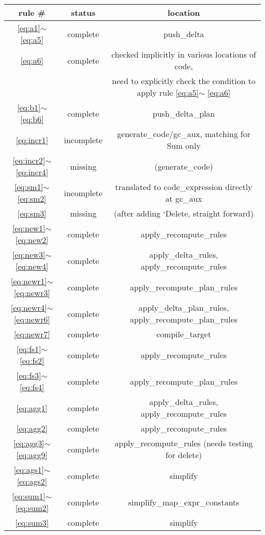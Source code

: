 \documentclass{article}
\begin{document}
\begin{tabular} {|c|c|c|}
\hline rule \# & status & location  \\
\hline \ref{eq:a1}$\sim$\ref{eq:a5} & complete & push\_delta \\
\hline \ref{eq:a6} & complete & checked implicitly in various locations of code, \\
&&need to explicitly check the condition to apply rule \ref{eq:a5}$\sim$ \ref{eq:a6}\\%
\hline \ref{eq:b1}$\sim$\ref{eq:b6} & complete & push\_delta\_plan\\
\hline \ref{eq:incr1} & incomplete & generate\_code/gc\_aux, matching for Sum only\\
\hline \ref{eq:incr2}$\sim$\ref{eq:incr4} & missing & (generate\_code)\\
\hline \ref{eq:sm1}$\sim$\ref{eq:sm2} & incomplete & translated to code\_expression directly at gc\_aux\\
\hline \ref{eq:sm3} & missing & (after adding `Delete, straight forward)\\
\hline \ref{eq:new1}$\sim$\ref{eq:new2} & complete & apply\_recompute\_rules\\
\hline \ref{eq:new3}$\sim$\ref{eq:new4} & complete & apply\_delta\_rules, apply\_recompute\_rules\\
\hline \ref{eq:newr1}$\sim$\ref{eq:newr3} & complete & apply\_recompute\_plan\_rules\\
\hline \ref{eq:newr4}$\sim$\ref{eq:newr6} & complete & apply\_delta\_plan\_rules, apply\_recompute\_plan\_rules\\
\hline \ref{eq:newr7} & complete & compile\_target\\
\hline \ref{eq:fs1}$\sim$\ref{eq:fs2} & complete & apply\_recompute\_rules\\
\hline \ref{eq:fs3}$\sim$\ref{eq:fs4} & complete & apply\_recompute\_plan\_rules\\
\hline \ref{eq:agg1} & complete & apply\_delta\_rules, apply\_recompute\_rules\\
\hline \ref{eq:agg2} & complete & apply\_recompute\_rules\\
\hline \ref{eq:agg3}$\sim$\ref{eq:agg9} & complete & apply\_recompute\_rules (needs testing for delete) \\
\hline \ref{eq:ags1}$\sim$\ref{eq:ags2} & complete & simplify \\
\hline \ref{eq:sum1}$\sim$\ref{eq:sum2} & complete & simplify\_map\_expr\_constants \\
\hline \ref{eq:sum3} & complete & simplify \\

\end{tabular}
\end{document}
